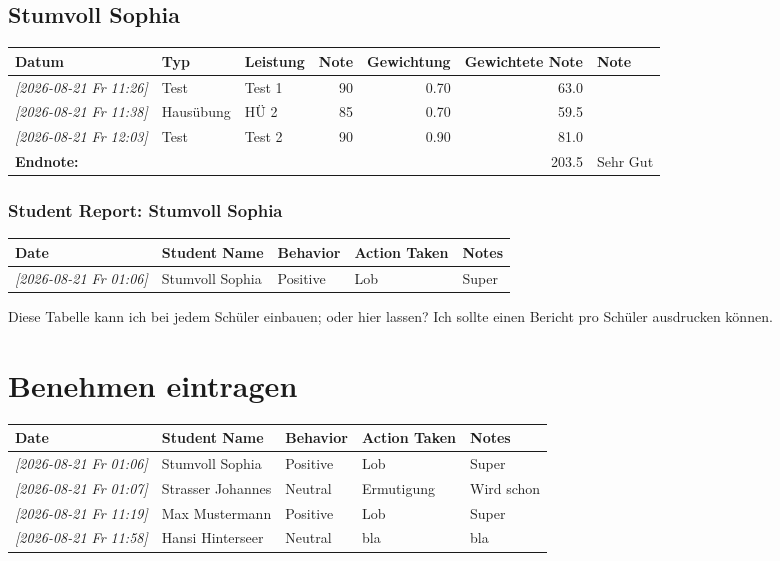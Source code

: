 \documentclass[11pt]{article}
\begin{document}
\subsection{Stumvoll Sophia}
\label{sec:orgc5d0441}
\begin{center}
\begin{tabular}{lllrrrl}
Datum & Typ & Leistung & Note & Gewichtung & Gewichtete Note & Note\\
\hline
\textit{{[}2026-08-21 Fr 11:26]} & Test & Test 1 & 90 & 0.70 & 63.0 & \\
\textit{{[}2026-08-21 Fr 11:38]} & Hausübung & HÜ 2 & 85 & 0.70 & 59.5 & \\
\textit{{[}2026-08-21 Fr 12:03]} & Test & Test 2 & 90 & 0.90 & 81.0 & \\
\hline
\textbf{Endnote:} &  &  &  &  & 203.5 & Sehr Gut\\
\end{tabular}
\end{center}
\subsubsection{Student Report: Stumvoll Sophia}
\label{sec:orgd98121e}

\begin{table}[htbp]
\label{tab:org537eb7c}
\centering
\begin{tabular}{lllll}
Date & Student Name & Behavior & Action Taken & Notes\\
\hline
\textit{{[}2026-08-21 Fr 01:06]} & Stumvoll Sophia & Positive & Lob & Super\\
\end{tabular}
\end{table}


Diese Tabelle kann ich bei jedem Schüler einbauen; oder hier lassen? Ich sollte einen Bericht pro Schüler ausdrucken können.
\section{Benehmen eintragen}
\label{sec:org2a2729a}
\begin{table}[htbp]
\label{tab:org6135c01}
\centering
\begin{tabular}{lllll}
Date & Student Name & Behavior & Action Taken & Notes\\
\hline
\textit{{[}2026-08-21 Fr 01:06]} & Stumvoll Sophia & Positive & Lob & Super\\
\textit{{[}2026-08-21 Fr 01:07]} & Strasser Johannes & Neutral & Ermutigung & Wird schon\\
\textit{{[}2026-08-21 Fr 11:19]} & Max Mustermann & Positive & Lob & Super\\
\textit{{[}2026-08-21 Fr 11:58]} & Hansi Hinterseer & Neutral & bla & bla\\
\hline
\end{tabular}
\end{table}
\end{document}
